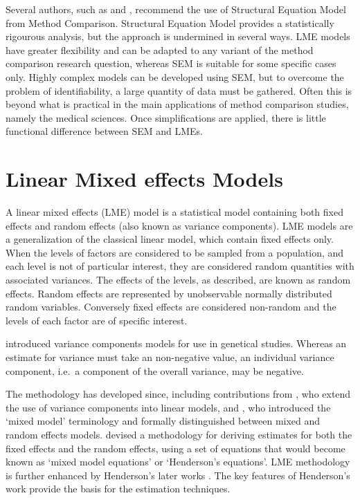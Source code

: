 \documentclass[12pt, a4paper]{report}
\theoremstyle{plain}
\theoremstyle{definition}
\theoremstyle{remark}
\begin{document}
Several authors, such as \citet{gkelly1985} and \citet{voelkel2005center}, recommend the use of Structural Equation Model from Method Comparison.
Structural Equation Model provides a statistically rigourous analysis, but the approach is undermined in several ways. LME models have greater flexibility and can be adapted to any variant of the method comparison research question, whereas 
SEM is suitable for some specific cases only. Highly complex models can be developed using SEM, but to overcome the problem of identifiability, a large quantity of data must be gathered.
Often this is beyond what is practical in the main applications of method comparison studies, namely the medical sciences. Once simplifications are applied, there is little functional difference between SEM and LMEs.

			\section{Linear Mixed effects Models}
			A linear mixed effects (LME) model is a statistical model containing both fixed effects and random effects (also known as variance components). LME models are a generalization of the classical linear model, which contain fixed effects only. When the levels of factors are considered to be sampled from a population,
			and each level is not of particular interest, they are considered random quantities with associated variances.
			The effects of the levels, as described, are known as random effects. Random effects are represented by unobservable
			normally distributed random variables. Conversely fixed effects are considered non-random and the
			levels of each factor are of specific interest.
			
			\citet{Fisher4} introduced variance components models for use in genetical studies. Whereas an estimate for variance must take an non-negative value, an individual variance component, i.e.\ a component of the overall variance, may be negative.
			
			The methodology has developed since, including contributions from
			\citet{tippett}, who extend the use of variance components into linear models, and \citet{eisenhart}, who introduced the `mixed model' terminology and formally distinguished between mixed and random effects models. \citet{Henderson:1950} devised a methodology for deriving estimates for both the fixed effects and the random effects, using a set of equations that would become known as `mixed model equations' or `Henderson's equations'.
			LME methodology is further enhanced by Henderson's later works \citep{Henderson53, Henderson59,Henderson63,Henderson73,Henderson84a}. The key features of Henderson's work provide the basis for the estimation techniques.
			
\end{document}
